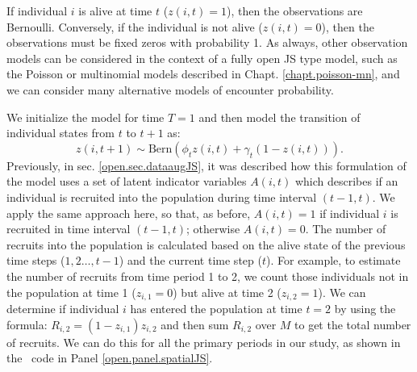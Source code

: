 If individual $i$ is alive at time $t$ ($z(i,t)=1$), then the
observations are Bernoulli.  Conversely, if the individual is
not alive ($z(i,t)=0$), then the observations must be fixed zeros with
probability 1.  As always, other observation models can be considered in
the context of a fully open JS type model, such as the
Poisson or multinomial models described
in Chapt. \ref{chapt.poisson-mn}, and we can consider many alternative
models of encounter probability.

We initialize the
model for time $T=1$
and then model the transition of individual states from
$t$ to $t+1$ as:
\[
 z(i,t+1) \sim \mbox{Bern}( \phi_t z(i,t)  + \gamma_t (1-z(i,t)) ).
\]
Previously, in sec. \ref{open.sec.dataaugJS}, it was described how this formulation of the model uses a set
of latent indicator variables $A(i,t)$ which describes if an individual
is recruited into the population during time interval $(t-1, t)$.  We apply the same approach here, so that, as before,
$A(i,t) = 1$ if individual $i$ is recruited in time interval $(t-1,
t)$; otherwise $A(i,t)=0$.  
The number of recruits into the
population is calculated based on the alive state of the previous time steps ($1, 2 \dots, t-1$) and the current time
step ($t$).
For example, to estimate the number of recruits from time period 1 to 2, we count those
individuals not in the population at time 1 ($z_{i,1} = 0$) but alive at time 2 ($z_{i,2} = 1$).
We can determine if individual $i$ has entered the population at time $t=2$ by using the formula:
 $R_{i,2}=(1-z_{i,1})z_{i,2}$ and then sum
$R_{i,2}$ over $M$ to get the total number of recruits.
We can do this for all the primary periods in our study,
as shown
in the \jags~code in Panel \ref{open.panel.spatialJS}.


